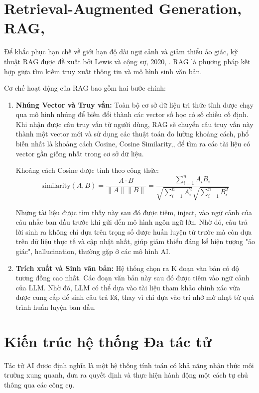 \section{Retrieval-Augmented Generation, RAG,}
Để khắc phục hạn chế về giới hạn độ dài ngữ cảnh và giảm thiểu ảo giác, kỹ thuật RAG được đề xuất bởi Lewis và cộng sự, 2020, \cite{lewis2020rag}. RAG là phương pháp kết hợp giữa tìm kiếm truy xuất thông tin và mô hình sinh văn bản.

Cơ chế hoạt động của RAG bao gồm hai bước chính:
\begin{enumerate}
    \item \textbf{Nhúng Vector và Truy vấn:} Toàn bộ cơ sở dữ liệu tri thức tĩnh được chạy qua mô hình nhúng để biến đổi thành các vector số học có số chiều cố định. Khi nhận được câu truy vấn từ người dùng, RAG sẽ chuyển câu truy vấn này thành một vector mới và sử dụng các thuật toán đo lường khoảng cách, phổ biến nhất là khoảng cách Cosine, Cosine Similarity,, để tìm ra các tài liệu có vector gần giống nhất trong cơ sở dữ liệu.

Khoảng cách Cosine được tính theo công thức:
\begin{equation}
\text{similarity}(A, B) = \frac{A \cdot B}{\|A\| \|B\|} = \frac{\sum_{i=1}^{n} A_i B_i}{\sqrt{\sum_{i=1}^{n} A_i^2} \sqrt{\sum_{i=1}^{n} B_i^2}}
\end{equation}

Những tài liệu được tìm thấy này sau đó được tiêm, inject, vào ngữ cảnh của câu nhắc ban đầu trước khi gửi đến mô hình ngôn ngữ lớn. Nhờ đó, câu trả lời sinh ra không chỉ dựa trên trọng số được huấn luyện từ trước mà còn dựa trên dữ liệu thực tế và cập nhật nhất, giúp giảm thiểu đáng kể hiện tượng "ảo giác", hallucination, thường gặp ở các mô hình AI.
    \item \textbf{Trích xuất và Sinh văn bản:} Hệ thống chọn ra K đoạn văn bản có độ tương đồng cao nhất. Các đoạn văn bản này sau đó được tiêm vào ngữ cảnh của LLM. Nhờ đó, LLM có thể dựa vào tài liệu tham khảo chính xác vừa được cung cấp để sinh câu trả lời, thay vì chỉ dựa vào trí nhớ mờ nhạt từ quá trình huấn luyện ban đầu.
\end{enumerate}

\section{Kiến trúc hệ thống Đa tác tử}
Tác tử AI được định nghĩa là một hệ thống tính toán có khả năng nhận thức môi trường xung quanh, đưa ra quyết định và thực hiện hành động một cách tự chủ thông qua các công cụ.

